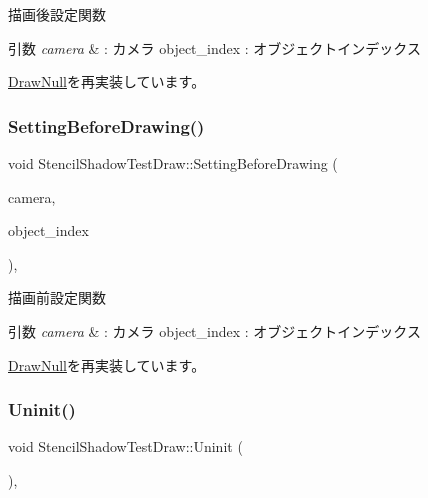 描画後設定関数 


\begin{DoxyParams}{引数}
{\em camera} & \+: カメラ object\+\_\+index \+: オブジェクトインデックス \\
\hline
\end{DoxyParams}


\mbox{\hyperlink{class_draw_null_a76edfc5af0bf3275f96f40394aff8510}{Draw\+Null}}を再実装しています。

\mbox{\label{class_stencil_shadow_test_draw_a0f697b6dad67048c7f8916a53cca6b1c}} 
\subsubsection{\texorpdfstring{Setting\+Before\+Drawing()}{SettingBeforeDrawing()}}
{\footnotesize\ttfamily void Stencil\+Shadow\+Test\+Draw\+::\+Setting\+Before\+Drawing (\begin{DoxyParamCaption}\item[{\mbox{\hyperlink{class_camera}{Camera}} $\ast$}]{camera,  }\item[{unsigned}]{object\+\_\+index }\end{DoxyParamCaption})\hspace{0.3cm}{\ttfamily [override]}, {\ttfamily [virtual]}}



描画前設定関数 


\begin{DoxyParams}{引数}
{\em camera} & \+: カメラ object\+\_\+index \+: オブジェクトインデックス \\
\hline
\end{DoxyParams}


\mbox{\hyperlink{class_draw_null_a7f0d52c5c2fb2d9b8eb423f363862290}{Draw\+Null}}を再実装しています。

\mbox{\label{class_stencil_shadow_test_draw_ad0672bf4ecfc8091cf54ed6f2c76b618}} 
\subsubsection{\texorpdfstring{Uninit()}{Uninit()}}
{\footnotesize\ttfamily void Stencil\+Shadow\+Test\+Draw\+::\+Uninit (\begin{DoxyParamCaption}{ }\end{DoxyParamCaption})\hspace{0.3cm}{\ttfamily [override]}, {\ttfamily [virtual]}}



